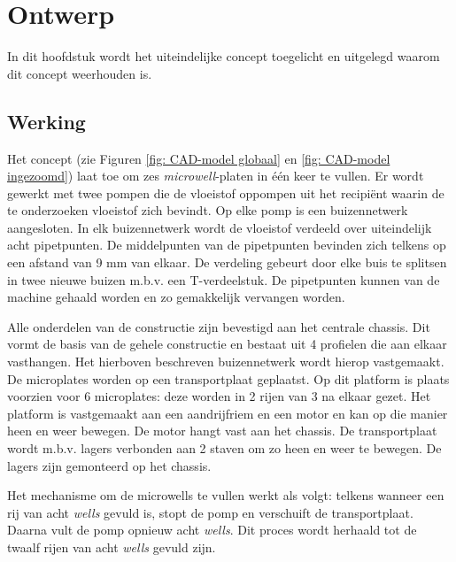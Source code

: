 \documentclass[a4paper,twoside,kulak]{kulakreport} %
\begin{document}
\chapter{Ontwerp} 


In dit hoofdstuk wordt het uiteindelijke concept toegelicht en uitgelegd waarom dit concept weerhouden is.

\section{Werking}

	Het concept (zie Figuren \ref{fig: CAD-model globaal} en \ref{fig: CAD-model ingezoomd}) laat toe om zes \textit{microwell}-platen in één keer te vullen. Er wordt gewerkt met twee pompen die de vloeistof oppompen uit het recipiënt waarin de te onderzoeken vloeistof zich bevindt. Op elke pomp is een buizennetwerk aangesloten. In elk buizennetwerk wordt de vloeistof verdeeld over uiteindelijk acht pipetpunten. De middelpunten van de pipetpunten bevinden zich telkens op een afstand van 9 mm van elkaar. De verdeling gebeurt door elke buis te splitsen in twee nieuwe buizen m.b.v. een T-verdeelstuk. De pipetpunten kunnen van de machine gehaald worden en zo gemakkelijk vervangen worden.
	
	Alle onderdelen van de constructie zijn bevestigd aan het centrale chassis. Dit vormt de basis van de gehele constructie en bestaat uit 4 profielen die aan elkaar vasthangen. Het hierboven beschreven buizennetwerk wordt hierop vastgemaakt.
	De microplates worden op een transportplaat geplaatst. Op dit platform is plaats voorzien voor 6 microplates: deze worden in 2 rijen van 3 na elkaar gezet. Het platform is vastgemaakt aan een aandrijfriem en een motor en kan op die manier heen en weer bewegen. De motor hangt vast aan het chassis. De transportplaat wordt m.b.v. lagers verbonden aan 2 staven om zo heen en weer te bewegen. De lagers zijn gemonteerd op het chassis.
	
	Het mechanisme om de microwells te vullen werkt als volgt: telkens wanneer een rij van acht \textit{wells} gevuld is, stopt de pomp en verschuift de transportplaat. Daarna vult de pomp opnieuw acht \textit{wells}. Dit proces wordt herhaald tot de twaalf rijen van acht \textit{wells} gevuld zijn. 
	
\end{document}
